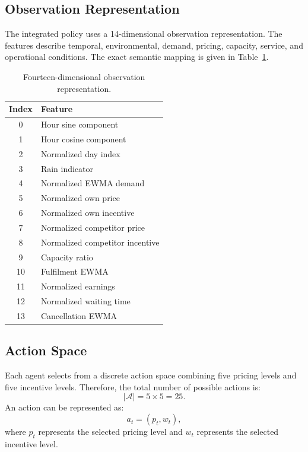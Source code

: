 \documentclass[conference]{IEEEtran}
\begin{document}
\subsection{Observation Representation}
The integrated policy uses a 14-dimensional observation representation. The features describe temporal, environmental, demand, pricing, capacity, service, and operational conditions. The exact semantic mapping is given in Table~\ref{tab:obs}.

\begin{table}[!t]
\centering
\caption{Fourteen-dimensional observation representation.}
\label{tab:obs}
\small
\begin{tabular}{cl}
\toprule
\textbf{Index} & \textbf{Feature} \\
\midrule
0  & Hour sine component \\
1  & Hour cosine component \\
2  & Normalized day index \\
3  & Rain indicator \\
4  & Normalized EWMA demand \\
5  & Normalized own price \\
6  & Normalized own incentive \\
7  & Normalized competitor price \\
8  & Normalized competitor incentive \\
9  & Capacity ratio \\
10 & Fulfilment EWMA \\
11 & Normalized earnings \\
12 & Normalized waiting time \\
13 & Cancellation EWMA \\
\bottomrule
\end{tabular}
\end{table}

\subsection{Action Space}
Each agent selects from a discrete action space combining five pricing levels and five incentive levels. Therefore, the total number of possible actions is:
\begin{equation}
  |\mathcal{A}| = 5 \times 5 = 25.
\end{equation}
An action can be represented as:
\begin{equation}
  a_t = (p_t, w_t),
\end{equation}
where $p_t$ represents the selected pricing level and $w_t$ represents the selected incentive level.
\end{document}
